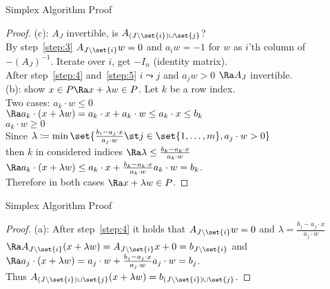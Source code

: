 \documentclass[a4paper, x11names, svgnames]{beamer}
\theoremstyle{definition}
\theoremstyle{plain}
\theoremstyle{plain}
\begin{document}
\begin{frame}{Simplex Algorithm Proof}
    \begin{proof}
    (c): $A_J$ invertible, is $A_{(J\setminus\set{i})\cup\set{j}}$? \\
         By step~\ref{step:3} $A_{J\setminus\set{i}} w = 0$ and $a_i w = -1$ for $w$ as $i$'th column of $-(A_J)^{-1}$.
         Iterate over $i$, get $-I_n$ (identity matrix). \pause \\
         After step~\ref{step:4} and~\ref{step:5} $i \leadsto j$ and $a_j w > 0$ $\Ra A_J$ invertible. \pause \\
    (b): show $x \in P \Ra x + \lambda w \in P$. Let $k$ be a row index.\\
         Two cases: %
         $a_k\cdot w \leq 0$\\
         $\Ra a_k\cdot (x+\lambda w) = a_k\cdot x + a_k\cdot w \leq a_k\cdot x \leq b_k$ \\
         $a_k \cdot w \geq 0$ \\
         Since $\lambda \coloneqq \min  \set{\frac{b_i - a_j\cdot x}{a_j\cdot w} \st j\in\set{1,\dots, m}, a_j\cdot w > 0}$ \\
         then $k$ in considered indices $\Ra \lambda \leq \frac{b_k - a_k\cdot x}{a_k\cdot w} $
         $\Ra a_k\cdot (x + \lambda w) \leq a_k\cdot x + \frac{b_k-a_k\cdot x}{a_k\cdot w} a_k\cdot w  = b_k$. \\
         Therefore in both cases $\Ra x+\lambda w \in P$.


    \end{proof}
\end{frame}

\begin{frame}{Simplex Algorithm Proof}
    \begin{proof}
        (a): After step~\ref{step:4} it holds that $A_{J\setminus\set{i}}w=0$ and $\lambda = \frac{b_j-a_j\cdot x}{a_j\cdot w}$
        $\Ra A_{J\setminus\set{i}}(x+\lambda w) = A_{J\setminus\set{i}}x + 0 = b_{J\setminus\set{i}}$
        and $\Ra a_j\cdot (x+\lambda w) = a_j \cdot w + \frac{b_j - a_j\cdot x}{a_j\cdot w} a_j\cdot w = b_j$. \\
        Thus $A_{(J\setminus\set{i})\cup\set{j}}(x+\lambda w) = b_{(J\setminus\set{i})\cup\set{j}}$.
    \end{proof}
\end{frame}
\end{document}
